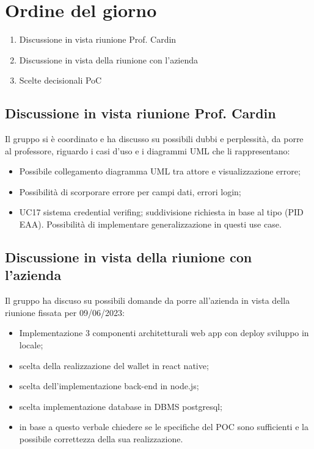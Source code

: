 \section{Ordine del giorno}
\begin{enumerate}
\item Discussione in vista riunione Prof. Cardin
\item Discussione in vista della riunione con l'azienda 
\item Scelte decisionali PoC
\end{enumerate}

\subsection{Discussione in vista riunione Prof. Cardin}
Il gruppo si è coordinato e ha discusso su possibili dubbi e perplessità, da porre al professore, riguardo i casi d'uso e i diagrammi UML che li rappresentano:
\begin{itemize}
    \item Possibile collegamento diagramma UML tra attore e visualizzazione errore;
    \item Possibilità di scorporare errore per campi dati, errori login;
    \item UC17 sistema credential verifing; suddivisione richiesta in base al tipo (PID EAA). Possibilità di implementare generalizzazione in questi use case.
\end{itemize}

\subsection{Discussione in vista della riunione con l'azienda}
Il gruppo ha discuso su possibili domande da porre all'azienda in vista della riunione fissata per 09/06/2023:
\begin{itemize}
\item Implementazione 3 componenti architetturali web app con deploy sviluppo in locale;
\item scelta della realizzazione del wallet in react native;
\item scelta dell'implementazione back-end in node.js;
\item scelta implementazione database in DBMS postgresql;
\item in base a questo verbale chiedere se le specifiche del POC sono sufficienti e la possibile correttezza della sua realizzazione.
\end{itemize}
